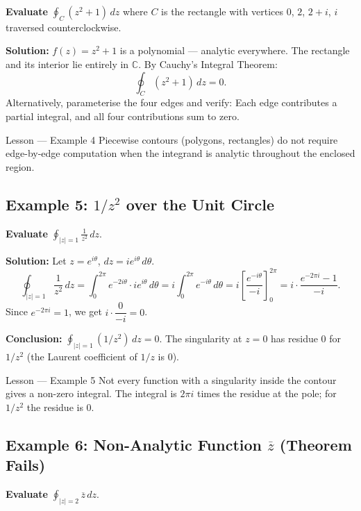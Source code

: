 \documentclass[12pt,a4paper]{article}
\begin{document}
\textbf{Evaluate} $\displaystyle\oint_{C} (z^2 + 1)\,dz$
where $C$ is the rectangle with vertices $0$, $2$, $2+i$, $i$ traversed counterclockwise.

\textbf{Solution:}
$f(z) = z^2 + 1$ is a polynomial --- analytic everywhere.
The rectangle and its interior lie entirely in $\mathbb{C}$.
By Cauchy's Integral Theorem:
\[
  \oint_{C} (z^2 + 1)\,dz = 0.
\]
Alternatively, parameterise the four edges and verify:
Each edge contributes a partial integral, and all four contributions sum to zero.

\begin{learnbox}{Lesson --- Example 4}
Piecewise contours (polygons, rectangles) do not require edge-by-edge computation
when the integrand is analytic throughout the enclosed region.
\end{learnbox}

\subsection*{Example 5: $1/z^2$ over the Unit Circle}

\textbf{Evaluate} $\displaystyle\oint_{|z|=1} \frac{1}{z^2}\,dz$.

\textbf{Solution:}
Let $z = e^{i\theta}$, $dz = ie^{i\theta}\,d\theta$.
\[
  \oint_{|z|=1} \frac{1}{z^2}\,dz
  = \int_{0}^{2\pi} e^{-2i\theta} \cdot ie^{i\theta}\,d\theta
  = i\int_{0}^{2\pi} e^{-i\theta}\,d\theta
  = i \left[\frac{e^{-i\theta}}{-i}\right]_{0}^{2\pi}
  = i \cdot \frac{e^{-2\pi i} - 1}{-i}.
\]
Since $e^{-2\pi i} = 1$, we get $i \cdot \dfrac{0}{-i} = 0$.

\textbf{Conclusion:} $\oint_{|z|=1}(1/z^2)\,dz = 0$.
The singularity at $z=0$ has residue $0$ for $1/z^2$ (the Laurent coefficient of $1/z$ is $0$).

\begin{learnbox}{Lesson --- Example 5}
Not every function with a singularity inside the contour gives a non-zero integral.
The integral is $2\pi i$ times the residue at the pole; for $1/z^2$ the residue is $0$.
\end{learnbox}

\subsection*{Example 6: Non-Analytic Function $\overline{z}$ (Theorem Fails)}

\textbf{Evaluate} $\displaystyle\oint_{|z|=2} \overline{z}\,dz$.
\end{document}
